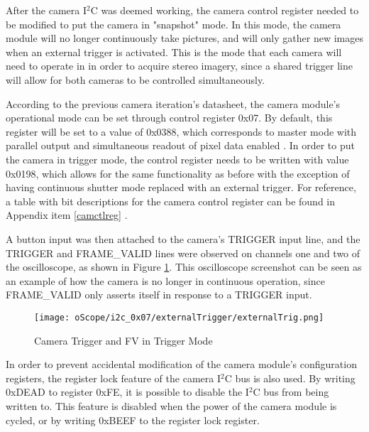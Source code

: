 \par
After the camera I$^2$C was deemed working, the camera control register needed to be modified to put the camera in "snapshot" mode. In this mode, the camera module will no longer continuously take pictures, and will only gather new images when an external trigger is activated. This is the mode that each camera will need to operate in in order to acquire stereo imagery, since a shared trigger line will allow for both cameras to be controlled simultaneously.
\par
According to the previous camera iteration's datasheet, the camera module's operational mode can be set through control register 0x07. By default, this register will be set to a value of 0x0388, which corresponds to master mode with parallel output and simultaneous readout of pixel data enabled \cite{mt9v032}. In order to put the camera in trigger mode, the control register needs to be written with value 0x0198, which allows for the same functionality as before with the exception of having continuous shutter mode replaced with an external trigger. For reference, a table with bit descriptions for the camera control register can be found in Appendix item \ref{camctlreg} \cite{mt9v032}.
\par
A button input was then attached to the camera's TRIGGER input line, and the TRIGGER and FRAME\_VALID lines were observed on channels one and two of the oscilloscope, as shown in Figure \ref{camInTrigMode}. This oscilloscope screenshot can be seen as an example of how the camera is no longer in continuous operation, since FRAME\_VALID only asserts itself in response to a TRIGGER input. 
\begin{figure}[H]
	\centerline{\texttt{[image: oScope/i2c\_0x07/externalTrigger/externalTrig.png]}}
	\caption{Camera Trigger and FV in Trigger Mode}
	\label{camInTrigMode}
\end{figure}
\par
In order to prevent accidental modification of the camera module's configuration registers, the register lock feature of the camera I$^2$C bus is also used. By writing 0xDEAD to register 0xFE, it is possible to disable the I$^2$C bus from being written to. This feature is disabled when the power of the camera module is cycled, or by writing 0xBEEF to the register lock register.
